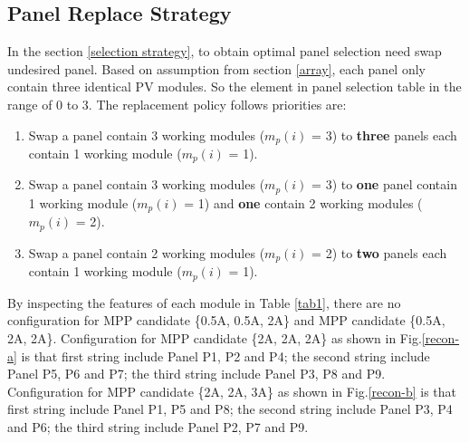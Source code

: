 \documentclass[conference]{IEEEtran}
\begin{document}
\subsection{Panel Replace Strategy}
In the section \ref{selection strategy}, to obtain optimal panel selection need swap undesired panel. Based on assumption from section \ref{array}, each panel only contain three identical PV modules. So the element in panel selection table in the range of 0 to 3. The replacement policy follows priorities are:
\begin{enumerate} [ (1) ]
\item Swap a panel contain 3 working modules ($m_p(i)$ = 3) to \textbf{three} panels each contain 1 working module ($m_p(i)$ = 1).
\item Swap a panel contain 3 working modules ($m_p(i)$ = 3) to \textbf{one} panel contain 1 working module ($m_p(i)$ = 1) and \textbf{one} contain 2 working modules ($m_p(i)$ = 2).
\item Swap a panel contain 2 working modules ($m_p(i)$ = 2) to \textbf{two} panels each contain 1 working module ($m_p(i)$ = 1).
\end{enumerate}

By inspecting the features of each module in Table \ref{tab1}, there are no configuration for MPP candidate \{0.5A, 0.5A, 2A\} and MPP candidate \{0.5A, 2A, 2A\}. Configuration for MPP candidate \{2A, 2A, 2A\} as shown in Fig.\ref{recon-a} is that first string include Panel P1, P2 and P4; the second string include Panel P5, P6 and P7; the third string include Panel P3, P8 and P9. Configuration for MPP candidate \{2A, 2A, 3A\} as shown in Fig.\ref{recon-b} is that first string include Panel P1, P5 and P8; the second string include Panel P3, P4 and P6; the third string include Panel P2, P7 and P9.
\end{document}
